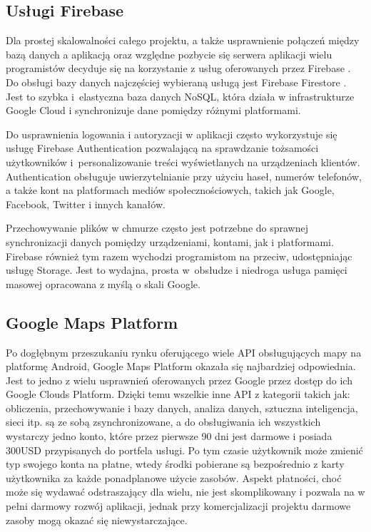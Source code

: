 \subsection*{Usługi Firebase}
Dla prostej skalowalności całego projektu, a także usprawnienie połączeń między bazą danych a aplikacją oraz względne pozbycie się serwera aplikacji wielu programistów decyduje się na korzystanie z usług oferowanych przez Firebase \cite{firebase}. Do obsługi bazy danych najczęściej wybieraną usługą jest Firebase Firestore \cite{firebase-book}. Jest to szybka i~elastyczna baza danych NoSQL, która działa w infrastrukturze Google Cloud i synchronizuje dane pomiędzy różnymi platformami.\par
Do usprawnienia logowania i autoryzacji w aplikacji często wykorzystuje się usługę Firebase Authentication \cite{fireauth} pozwalającą na sprawdzanie tożsamości użytkowników i~personalizowanie treści wyświetlanych na urządzeniach klientów. Authentication obsługuje uwierzytelnianie przy użyciu haseł, numerów telefonów, a także kont na platformach mediów społecznościowych, takich jak Google, Facebook, Twitter i innych kanałów.\par
Przechowywanie plików w chmurze często jest potrzebne do sprawnej synchronizacji danych pomiędzy urządzeniami, kontami, jak i platformami. Firebase również tym razem wychodzi programistom na przeciw, udostępniając usługę Storage. Jest to wydajna, prosta w~obsłudze i niedroga usługa pamięci masowej opracowana z myślą o skali Google.

\subsection*{Google Maps Platform}
Po dogłębnym przeszukaniu rynku oferującego wiele API obsługujących mapy na platformę Android, Google Maps Platform \cite{gmapsand} okazała się najbardziej odpowiednia. Jest to jedno z wielu usprawnień oferowanych przez Google przez dostęp do ich Google Clouds Platform. Dzięki temu wszelkie inne API z kategorii takich jak: obliczenia, przechowywanie i bazy danych, analiza danych, sztuczna inteligencja, sieci itp. są ze sobą zsynchronizowane, a do obsługiwania ich wszystkich wystarczy jedno konto, które przez pierwsze 90 dni jest darmowe i posiada 300USD przypisanych do portfela usługi. Po tym czasie użytkownik może zmienić typ swojego konta na płatne, wtedy środki pobierane są bezpośrednio z karty użytkownika za każde ponadplanowe użycie zasobów.
Aspekt płatności, choć może się wydawać odstraszający dla wielu, nie jest skomplikowany i pozwala na w pełni darmowy rozwój aplikacji, jednak przy komercjalizacji projektu darmowe zasoby mogą okazać się niewystarczające. \cite{gmapsogol}



